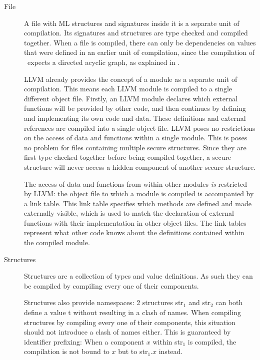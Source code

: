 \begin{description}
\item[File]
A file with ML structures and signatures inside it is a separate unit of compilation.
Its signatures and structures are type checked and compiled together. 
When a file is compiled, there can only be dependencies on values that were defined in an earlier unit of compilation, since the compilation of \MiniML\ expects a directed acyclic graph, as explained in .

LLVM already provides the concept of a module as a separate unit of compilation.
This means each LLVM module is compiled to a single different object file.
Firstly, an LLVM module declares which external functions will be provided by other code, and then continues by defining and implementing its own code and data.
These definitions and external references are compiled into a single object file.
LLVM poses no restrictions on the access of data and functions within a single module.
This is poses no problem for files containing multiple secure structures. Since they are first type checked together before being compiled together, a secure structure will never access a hidden component of another secure structure.

The access of data and functions from within other modules \emph{is} restricted by LLVM: the object file to which a module is compiled is accompanied by a link table.
This link table specifies which methods are defined and made externally visible, which is used to match the declaration of external functions with their implementation in other object files.
The link tables represent what other code knows about the definitions contained within the compiled module.


\item[Structures]
Structures are a collection of types and value definitions.
As such they can be compiled by compiling every one of their components.

Structures also provide namespaces: 2 structures str$_{1}$ and str$_{2}$ can both define a value t without resulting in a clash of names.
When compiling structures by compiling every one of their components, this situation should not introduce a clash of names either.
This is guaranteed by identifier prefixing: When a component $x$ within str$_{1}$ is compiled, the compilation is not bound to $x$ but to str$_{1}.x$ instead.



\end{description}
